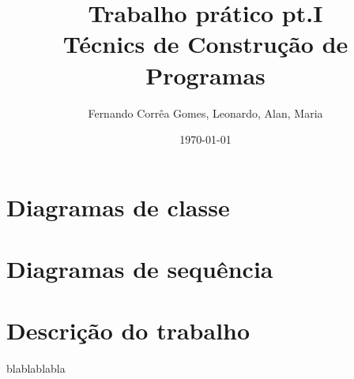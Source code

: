 \documentclass[cic]{iiufrgs}
\author{Fernando Corrêa Gomes, Leonardo, Alan, Maria}
\date{\today}
\title{Trabalho prático pt.I\\\medskip
\large Técnics de Construção de Programas}
\begin{document}
\maketitle

\chapter{Diagramas de classe}
\label{sec:org78f2985}
\chapter{Diagramas de sequência}
\label{sec:org47302ba}
\chapter{Descrição do trabalho}
\label{sec:org4641666}
blablablabla
\end{document}
